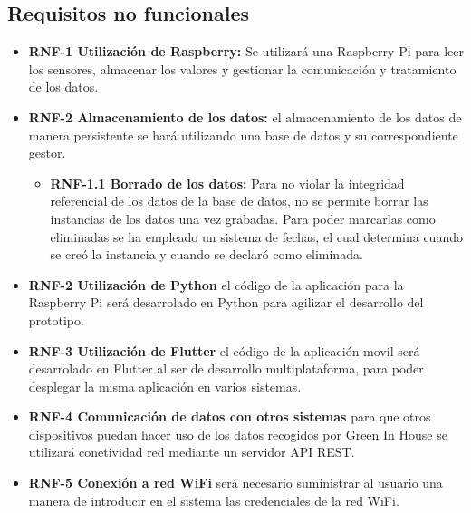     \subsection{Requisitos no funcionales}
    \begin{itemize}
        \item \textbf{RNF-1 Utilización de Raspberry:} Se utilizará una Raspberry Pi para leer los sensores, almacenar los valores y gestionar la comunicación y tratamiento de los datos.
        \item \textbf{RNF-2 Almacenamiento de los datos:} el almacenamiento de los datos de manera persistente se hará utilizando una base de datos y su correspondiente gestor.
        \begin{itemize}
            \item \textbf{RNF-1.1 Borrado de los datos:} Para no violar la integridad referencial de los datos de la base de datos, no se permite borrar las instancias de los datos una vez grabadas. Para poder marcarlas como eliminadas se ha empleado un sistema de fechas, el cual determina cuando se creó la instancia y cuando se declaró como eliminada.
        \end{itemize}
        \item \textbf{RNF-2 Utilización de Python} el código de la aplicación para la Raspberry Pi será desarrolado en Python para agilizar el desarrollo del prototipo.
        \item \textbf{RNF-3 Utilización de Flutter} el código de la aplicación movil será desarrolado en Flutter al ser de desarrollo multiplataforma, para poder desplegar la misma aplicación en varios sistemas.
        \item \textbf{RNF-4 Comunicación de datos con otros sistemas} para que otros dispositivos puedan hacer uso de los datos recogidos por Green In House se utilizará conetividad red mediante un servidor API REST.
        \item \textbf{RNF-5 Conexión a red WiFi} será necesario suministrar al usuario una manera de introducir en el sistema las credenciales de la red WiFi.
    \end{itemize}

